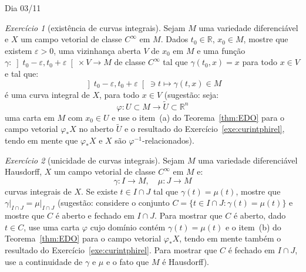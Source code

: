 \documentclass[oneside,11pt]{amsart}
\newcommand{\R}{\mathds R}
\theoremstyle{remark}\newtheorem{exercise}{Exercício}[section]
\theoremstyle{plain}\newtheorem{teo}{Teorema}[section]
\theoremstyle{plain}\newtheorem{lem}[teo]{Lema}
\theoremstyle{plain}\newtheorem{prop}[teo]{Proposição}
\theoremstyle{definition}\newtheorem{defin}[teo]{Definição}
\theoremstyle{remark}\newtheorem{rem}[teo]{Observação}
\theoremstyle{definition}\newtheorem{example}[teo]{Exemplo}
\numberwithin{equation}{section}
\begin{document}
\begin{section}{Dia 03/11}
\begin{exercise}[existência de curvas integrais]\label{exe:fluxolocal}
Sejam $M$ uma variedade diferenciável e $X$ um campo vetorial de classe $C^\infty$ em $M$. Dados $t_0\in\R$, $x_0\in M$, mostre que existem $\varepsilon>0$,
uma vizinhança aberta $V$ de $x_0$ em $M$ e uma função $\gamma:\left]t_0-\varepsilon,t_0+\varepsilon\right[\times V\to M$ de classe $C^\infty$ tal que
$\gamma(t_0,x)=x$ para todo $x\in V$ e tal que:
\[\left]t_0-\varepsilon,t_0+\varepsilon\right[\ni t\longmapsto\gamma(t,x)\in M\]
é uma curva integral de $X$, para todo $x\in V$ (sugestão: seja:
\[\varphi:U\subset M\longrightarrow\widetilde U\subset\R^n\]
uma carta em $M$ com $x_0\in U$
e use o item~(a) do Teorema~\ref{thm:EDO} para o campo vetorial $\varphi_*X$ no aberto $\widetilde U$ e o
resultado do Exercício~\ref{exe:curintphirel},
tendo em mente que $\varphi_*X$ e $X$ são $\varphi^{-1}$-relacionados).
\end{exercise}

\begin{exercise}[unicidade de curvas integrais]\label{exe:uniccurvainteg}
Sejam $M$ uma variedade diferenciável Hausdorff, $X$ um campo vetorial de classe $C^\infty$ em $M$ e:
\[\gamma:I\longrightarrow M,\quad\mu:J\longrightarrow M\]
curvas integrais de $X$. Se existe $t\in I\cap J$ tal que $\gamma(t)=\mu(t)$, mostre que $\gamma\vert_{I\cap J}=\mu\vert_{I\cap J}$ (sugestão: considere
o conjunto $C=\big\{t\in I\cap J:\gamma(t)=\mu(t)\big\}$ e mostre que $C$ é aberto e fechado em $I\cap J$. Para mostrar que $C$ é aberto, dado $t\in C$,
use uma carta $\varphi$ cujo domínio contém $\gamma(t)=\mu(t)$ e o item~(b) do Teorema~\ref{thm:EDO} para o campo vetorial $\varphi_*X$, tendo
em mente também o resultado do Exercício~\ref{exe:curintphirel}.
Para mostrar que $C$ é fechado em $I\cap J$, use a continuidade de $\gamma$ e $\mu$ e o fato que $M$ é Hausdorff).
\end{exercise}


\end{section}
\end{document}
